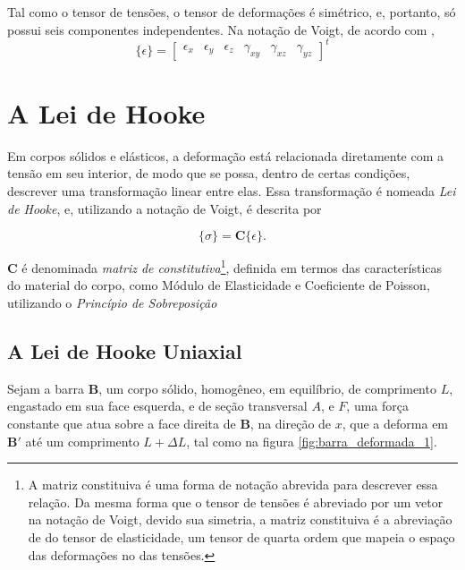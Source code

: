 Tal como o tensor de tensões, o tensor de deformações é simétrico, e, portanto, só possui seis componentes independentes. Na notação de Voigt, de acordo com ,
\begin{equation}
    \{\epsilon\} = \begin{bmatrix}
        \epsilon_x & \epsilon_y & \epsilon_z & \gamma_{xy} & \gamma_{xz} & \gamma_{yz}
    \end{bmatrix}^t
\end{equation}

\section{A Lei de Hooke}

Em corpos sólidos e elásticos, a deformação está relacionada diretamente com a tensão em seu interior, de modo que se possa, dentro de certas condições, descrever uma transformação linear entre elas. Essa transformação é nomeada \emph{Lei de Hooke}, e, utilizando a notação de Voigt, é descrita por

\begin{equation}
    \{\sigma\} = \bm{C} \{\epsilon\}.
    \label{eq:lei_de_hooke}
\end{equation}

$\bm{C}$ é denominada \emph{matriz de constitutiva}\footnote{A matriz constituiva é uma forma de notação abrevida para descrever essa relação. Da mesma forma que o tensor de tensões é abreviado por um vetor na notação de Voigt, devido sua simetria, a matriz constituiva é a abreviação de do tensor de elasticidade, um tensor de quarta ordem que mapeia o espaço das deformações no das tensões.}, definida em termos das características do material do corpo, como Módulo de Elasticidade e Coeficiente de Poisson, utilizando o \emph{Princípio de Sobreposição}

\subsection{A Lei de Hooke Uniaxial}

Sejam a barra $\bm{B}$, um corpo sólido, homogêneo, em equilíbrio, de comprimento $L$, engastado em sua face esquerda, e de seção transversal $A$, e $F$, uma força constante que atua sobre a face direita de $\bm{B}$, na direção de $x$, que a deforma em $\bm{B}'$ até um comprimento $L+\Delta L$, tal como na figura \ref{fig:barra_deformada_1}. 



